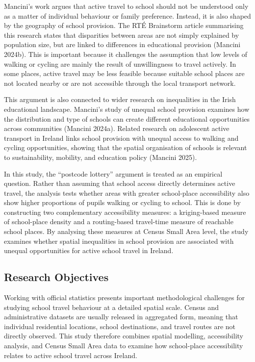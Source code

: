 \documentclass{article}
\begin{document}
Mancini's work argues that active travel to school should not be
understood only as a matter of individual behaviour or family
preference. Instead, it is also shaped by the geography of school
provision. The RTÉ Brainstorm article summarising this research states
that disparities between areas are not simply explained by population
size, but are linked to differences in educational provision (Mancini
2024b). This is important because it challenges the assumption that low
levels of walking or cycling are mainly the result of unwillingness to
travel actively. In some places, active travel may be less feasible
because suitable school places are not located nearby or are not
accessible through the local transport network.

This argument is also connected to wider research on inequalities in the
Irish educational landscape. Mancini's study of unequal school provision
examines how the distribution and type of schools can create different
educational opportunities across communities (Mancini 2024a). Related
research on adolescent active transport in Ireland links school
provision with unequal access to walking and cycling opportunities,
showing that the spatial organisation of schools is relevant to
sustainability, mobility, and education policy (Mancini 2025).

In this study, the ``postcode lottery'' argument is treated as an
empirical question. Rather than assuming that school access directly
determines active travel, the analysis tests whether areas with greater
school-place accessibility also show higher proportions of pupils
walking or cycling to school. This is done by constructing two
complementary accessibility measures: a kriging-based measure of
school-place density and a routing-based travel-time measure of
reachable school places. By analysing these measures at Census Small
Area level, the study examines whether spatial inequalities in school
provision are associated with unequal opportunities for active school
travel in Ireland.

\subsection{Research Objectives}\label{research-objectives}

Working with official statistics presents important methodological
challenges for studying school travel behaviour at a detailed spatial
scale. Census and administrative datasets are usually released in
aggregated form, meaning that individual residential locations, school
destinations, and travel routes are not directly observed. This study
therefore combines spatial modelling, accessibility analysis, and Census
Small Area data to examine how school-place accessibility relates to
active school travel across Ireland.
\end{document}
